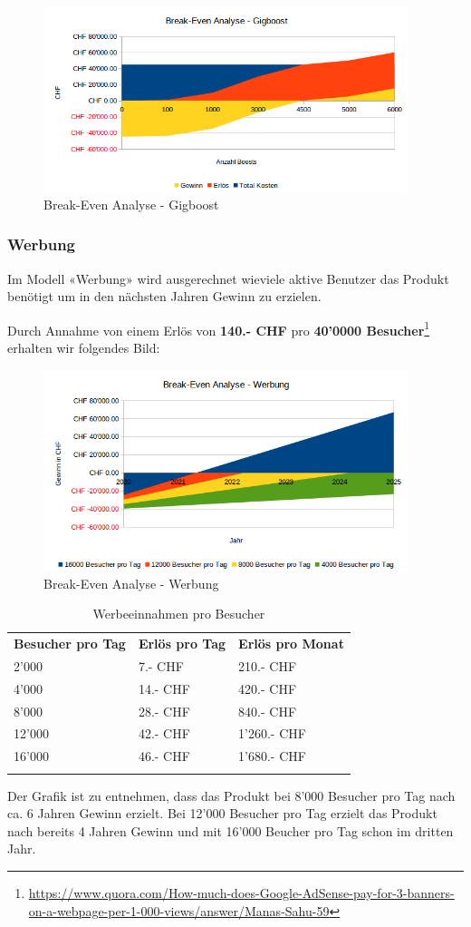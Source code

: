 \begin{figure}[!htb]
  \centering
  \includegraphics[width=0.95\textwidth]{initialisierung/wirtschaftlichkeit-gigboost.png}
  \caption{Break-Even Analyse - Gigboost}
\end{figure}

\clearpage
\subsubsection{Werbung}

Im Modell «Werbung» wird ausgerechnet wieviele aktive Benutzer das Produkt benötigt
um in den nächsten Jahren Gewinn zu erzielen.

Durch Annahme von einem Erlös von \textbf{140.- CHF} pro \textbf{40'0000 Besucher}\footnote{\url{https://www.quora.com/How-much-does-Google-AdSense-pay-for-3-banners-on-a-webpage-per-1-000-views/answer/Manas-Sahu-59}} erhalten wir folgendes Bild:

\begin{figure}[!htb]
  \centering
  \includegraphics[width=0.95\textwidth]{initialisierung/wirtschaftlichkeit-werbung.png}
  \caption{Break-Even Analyse - Werbung}
\end{figure}

\begin{longtable}[]{@{}lll@{}}
  \toprule
  \textbf{Besucher pro Tag} & \textbf{Erlös pro Tag} & \textbf{Erlös pro Monat}\tabularnewline
   2'000                    & 7.- CHF                & 210.- CHF\tabularnewline
   4'000                    & 14.- CHF               & 420.- CHF\tabularnewline
   8'000                    & 28.- CHF               & 840.- CHF\tabularnewline
  12'000                    & 42.- CHF               & 1'260.- CHF\tabularnewline
  16'000                    & 46.- CHF               & 1'680.- CHF\tabularnewline
  \bottomrule
  \caption{Werbeeinnahmen pro Besucher}
\end{longtable}

Der Grafik ist zu entnehmen, dass das Produkt bei 8'000 Besucher pro Tag nach ca. 6 Jahren Gewinn erzielt. Bei 12'000 Besucher pro Tag erzielt das Produkt nach bereits 4 Jahren Gewinn und mit 16'000 Beucher pro Tag schon im dritten Jahr.
